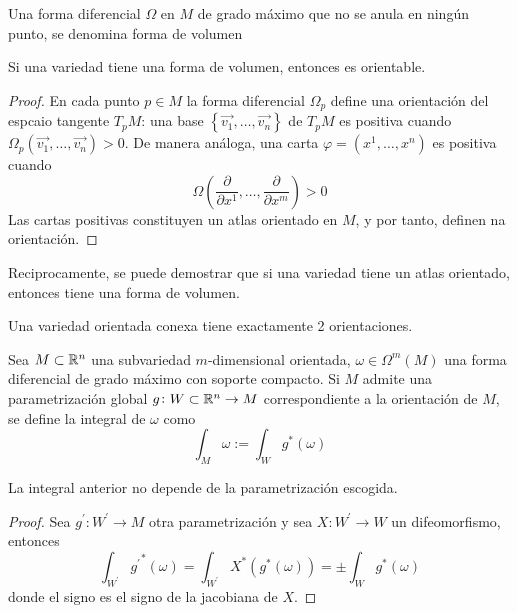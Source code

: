 \begin{defi}
    Una forma diferencial $\Omega$ en $M$ de grado máximo que no se anula en ningún punto, se denomina forma de volumen
\end{defi}

\begin{prop*}
    Si una variedad tiene una forma de volumen, entonces es orientable.
\end{prop*}

\begin{proof}
    En cada punto $p \in M$ la forma diferencial $\Omega_p$ define una orientación del espcaio tangente $T_pM$:
    una base $\left\{ \vec{v_1}, \dots, \vec{v_n} \right\}$ de $T_pM$ es positiva cuando
    $\Omega_p\left( \vec{v_1}, \dots, \vec{v_n} \right) > 0$. De manera análoga, una carta $\varphi = \left( x^1, \dots, x^n \right)$
    es positiva cuando
    \[
        \Omega\left( \frac{\partial}{\partial x^1}, \dots, \frac{\partial}{\partial x^m} \right) > 0
    \]
    Las cartas positivas constituyen un atlas orientado en $M$, y por tanto, definen na orientación.
\end{proof}

\begin{obs*}
    Reciprocamente, se puede demostrar que si una variedad tiene un atlas orientado, entonces tiene una forma de volumen.
\end{obs*}

\begin{obs}
    Una variedad orientada conexa tiene exactamente 2 orientaciones.
\end{obs}

\begin{defi}
    Sea $M \subset \mathbb{R}^n$ una subvariedad $m$-dimensional orientada, $\omega \in \Omega^m\left( M \right)$ una forma diferencial
    de grado máximo con soporte compacto. Si $M$ admite una parametrización global $g \colon W \subset \mathbb{R}^n \to M$ correspondiente
    a la orientación de $M$, se define la integral de $\omega$ como
    \[
        \int_M \omega := \int_W g^\ast(\omega)
    \]
\end{defi}

\begin{lema*}
    La integral anterior no depende de la parametrización escogida.
\end{lema*}

\begin{proof}
    Sea $g^\prime \colon W^\prime \to M$ otra parametrización y sea $X \colon W^\prime \to W$ un difeomorfismo, entonces
    \[
        \int_{W^\prime} {g^\prime}^\ast(\omega) = \int_{W^\prime} X^\ast\left( g^\ast(\omega) \right) = \pm \int_W g^\ast(\omega)
    \]
    donde el signo es el signo de la jacobiana de $X$.
\end{proof}

